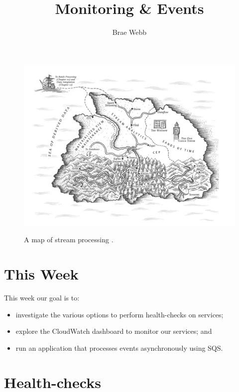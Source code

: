 \documentclass{csse4400}
\title{Monitoring \& Events}
\author{Brae Webb}
\date{\week{6}}
\begin{document}
\maketitle

\begin{figure}[ht]
  \href{https://www.oreilly.com/library/view/designing-data-intensive-applications/9781491903063/ch11.html}{
    \includegraphics[width=\textwidth]{images/streams}
  }
\caption{A map of stream processing \cite{data-intensive}.}
\end{figure}

\section{This Week}
This week our goal is to:
\begin{itemize}
  \item investigate the various options to perform health-checks on services;
  \item explore the CloudWatch dashboard to monitor our services; and
  \item run an application that processes events asynchronously using SQS.
\end{itemize}


\section{Health-checks}

\end{document}
